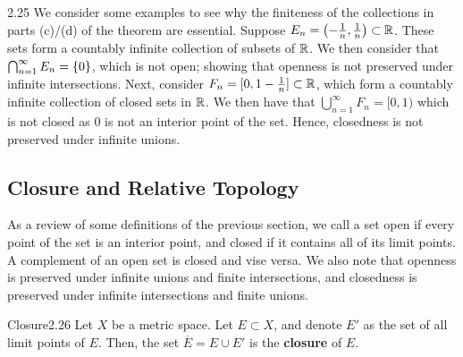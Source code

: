 \begin{example}{}{2.25}
    We consider some examples to see why the finiteness of the collections in parts (c)/(d) of the theorem are essential. Suppose $E_n = \left(-\frac{1}{n}, \frac{1}{n}\right) \subset \mathbb{R}$. These sets form a countably infinite collection of subsets of $\mathbb{R}$. We then consider that $\bigcap_{n=1}^\infty E_n = \set{0}$, which is not open; showing that openness is not preserved under infinite intersections. Next, consider $F_n = [0, 1-\frac{1}{n}] \subset \mathbb{R}$, which form a countably infinite collection of closed sets in $\mathbb{R}$. We then have that $\bigcup_{n=1}^\infty F_n = [0, 1)$ which is not closed as $0$ is not an interior point of the set. Hence, closedness is not preserved under infinite unions. 
\end{example}

\subsection{Closure and Relative Topology}
As a review of some definitions of the previous section, we call a set open if every point of the set is an interior point, and closed if it contains all of its limit points. A complement of an open set is closed and vise versa. We also note that openness is preserved under infinite unions and finite intersections, and closedness is preserved under infinite intersections and finite unions. 

\begin{definition}{Closure}{2.26}
    Let $X$ be a metric space. Let $E \subset X$, and denote $E'$ as the set of all limit points of $E$. Then, the set $\overline{E} = E \cup E'$ is the \textbf{closure} of $E$.
\end{definition}

